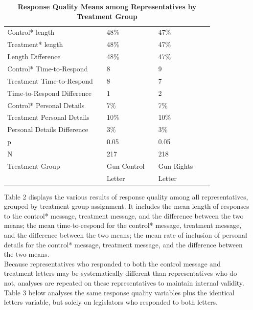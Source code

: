 \documentclass[12pt]{article}
\begin{document}
 \begin{table}[h!]
	\caption{\textbf{Response Quality Means among Representatives by Treatment Group}}
	\label{tab2}
	\begin{tabular}{lllllll}
		Control* length   && 48\%            &&   47\%\\
		Treatment* length   && 48\%            &&   47\%\\
		Length Difference   && 48\%            &&   47\%\\
		\hline
		Control* Time-to-Respond   && 8            &&   9\\
		Treatment Time-to-Respond && 8          &&   7\\ 
		Time-to-Respond Difference && 1            &&   2\\
		\hline 
		Control* Personal Details                && 7\%            &&   7\% \\
		Treatment Personal Details                && 10\%            &&   10\%\\
		Personal Details Difference && 3\%                      && 3\%\\
		\hline
		p            && 0.05 				&&   0.05 \\
		N 			 &&      217 			 &&  218    \\
		\hline
		Treatment Group && Gun Control  && Gun Rights & \\
		&&	Letter		&& Letter
	\end{tabular}
\end{table}

Table 2 displays the various results of response quality among all representatives, grouped by treatment group assignment. It includes the mean length of responses to the control* message, treatment message, and the difference between the two means; the mean time-to-respond for the control* message, treatment message, and the difference between the two means; the mean rate of inclusion of personal details for the control* message, treatment message, and the difference between the two means.\\
Because representatives who responded to both the control message and treatment letters may be systematically different than representatives who do not, analyses are repeated on these representatives to maintain internal validity. Table 3 below analyses the same response quality variables plus the identical letters variable, but solely on legislators who responded to both letters.
\end{document}
